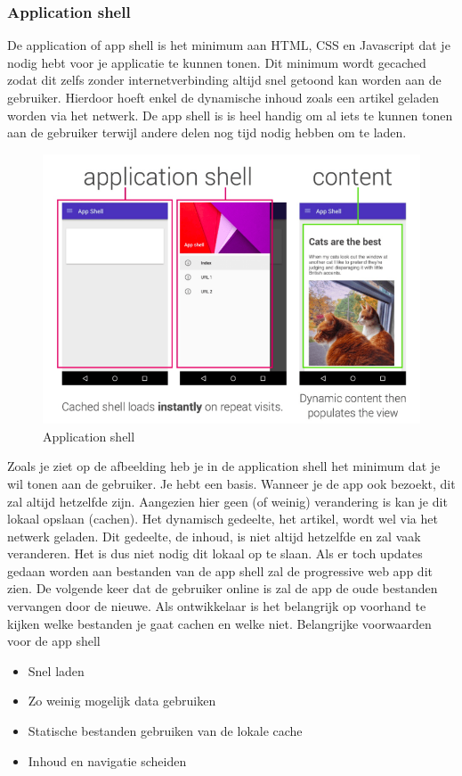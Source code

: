 \subsubsection{Application shell}
De application of app shell is het minimum aan HTML, CSS en Javascript dat je nodig hebt voor je applicatie te kunnen tonen. Dit minimum wordt gecached zodat dit zelfs zonder internetverbinding altijd snel getoond kan worden aan de gebruiker. Hierdoor hoeft enkel de dynamische inhoud zoals een artikel geladen worden via het netwerk.
De app shell is is heel handig om al iets te kunnen tonen aan de gebruiker terwijl andere delen nog tijd nodig hebben om te laden.
\begin{figure}[h]
	\includegraphics[scale=0.75]{img/appShell.png}
	\caption{Application shell}
	\label{fig:appShell}
\end{figure}
Zoals je ziet op de afbeelding heb je in de application shell het minimum dat je wil tonen aan de gebruiker. Je hebt een basis. Wanneer je de app ook bezoekt, dit zal altijd hetzelfde zijn. Aangezien hier geen (of weinig) verandering is kan je dit lokaal opslaan (cachen). Het dynamisch gedeelte, het artikel, wordt wel via het netwerk geladen. Dit gedeelte, de inhoud, is niet altijd hetzelfde en zal vaak veranderen. Het is dus niet nodig dit lokaal op te slaan. Als er toch updates gedaan worden aan bestanden van de app shell zal de progressive web app dit zien. De volgende keer dat de gebruiker online is zal de app de oude bestanden vervangen door de nieuwe. Als ontwikkelaar is het belangrijk op voorhand te kijken welke bestanden je gaat cachen en welke niet.
Belangrijke voorwaarden voor de app shell 
\begin{itemize}  
	\item Snel laden
	\item Zo weinig mogelijk data gebruiken
	\item Statische bestanden gebruiken van de lokale cache
	\item Inhoud en navigatie scheiden
\end{itemize}

